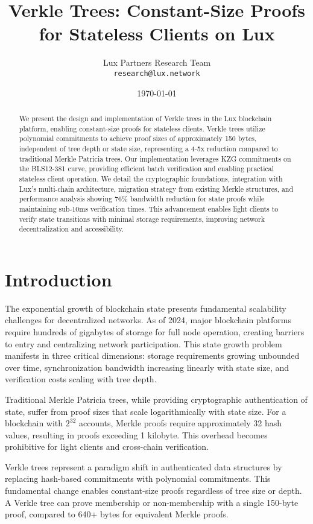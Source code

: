 \documentclass[11pt,a4paper]{article}
\title{\textbf{Verkle Trees: Constant-Size Proofs for Stateless Clients on Lux}}
\author{
    Lux Partners Research Team\\
    \texttt{research@lux.network}
}
\date{\today}
\theoremstyle{definition}
\begin{document}
\maketitle

\begin{abstract}
We present the design and implementation of Verkle trees in the Lux blockchain platform, enabling constant-size proofs for stateless clients. Verkle trees utilize polynomial commitments to achieve proof sizes of approximately 150 bytes, independent of tree depth or state size, representing a 4-5x reduction compared to traditional Merkle Patricia trees. Our implementation leverages KZG commitments on the BLS12-381 curve, providing efficient batch verification and enabling practical stateless client operation. We detail the cryptographic foundations, integration with Lux's multi-chain architecture, migration strategy from existing Merkle structures, and performance analysis showing 76\% bandwidth reduction for state proofs while maintaining sub-10ms verification times. This advancement enables light clients to verify state transitions with minimal storage requirements, improving network decentralization and accessibility.
\end{abstract}

\section{Introduction}

The exponential growth of blockchain state presents fundamental scalability challenges for decentralized networks. As of 2024, major blockchain platforms require hundreds of gigabytes of storage for full node operation, creating barriers to entry and centralizing network participation. This state growth problem manifests in three critical dimensions: storage requirements growing unbounded over time, synchronization bandwidth increasing linearly with state size, and verification costs scaling with tree depth.

Traditional Merkle Patricia trees, while providing cryptographic authentication of state, suffer from proof sizes that scale logarithmically with state size. For a blockchain with $2^{32}$ accounts, Merkle proofs require approximately 32 hash values, resulting in proofs exceeding 1 kilobyte. This overhead becomes prohibitive for light clients and cross-chain verification.

Verkle trees represent a paradigm shift in authenticated data structures by replacing hash-based commitments with polynomial commitments. This fundamental change enables constant-size proofs regardless of tree size or depth. A Verkle tree can prove membership or non-membership with a single 150-byte proof, compared to 640+ bytes for equivalent Merkle proofs.
\end{document}
